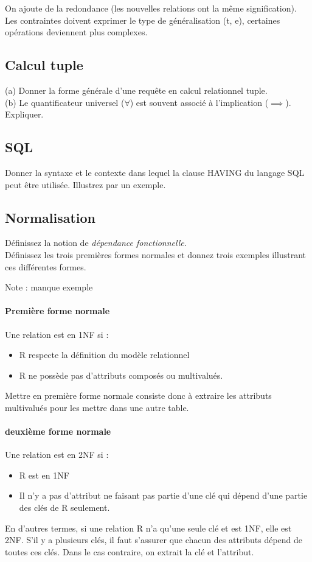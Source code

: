 On ajoute de la redondance (les nouvelles relations ont la m\^eme signification).
Les contraintes doivent exprimer le type de généralisation (t, e), 
certaines opérations deviennent plus complexes.

\subsection{Calcul tuple}

(a) Donner la forme générale d'une requête en calcul relationnel tuple.\\
(b) Le quantificateur universel ($\forall$) est souvent associé à l'implication 
($\implies$). Expliquer.

\subsection{SQL}
Donner la syntaxe et le contexte dans lequel la clause HAVING du langage SQL peut être 
utilisée. Illustrez par un exemple.



\subsection{Normalisation}
Définissez la notion de \textit{dépendance fonctionnelle}. \\
Définissez les trois premières formes normales et donnez trois exemples 
illustrant ces différentes formes.

Note : manque exemple

\paragraph{Première forme normale}
Une relation est en 1NF si : 
\begin{itemize}
	\item R respecte la définition du modèle relationnel
	\item R ne possède pas d'attributs composés ou multivalués.
\end{itemize}
Mettre en première forme normale consiste donc à extraire les attributs multivalués pour les mettre dans une autre table.

\paragraph{deuxième forme normale}
Une relation est en 2NF si : 
\begin{itemize}
	\item R est en 1NF
	\item Il n'y a pas d'attribut ne faisant pas partie d'une clé qui dépend 
	d'une partie des clés de R seulement.
\end{itemize}
En d'autres termes, si une relation R n'a qu'une seule clé et est 1NF, 
elle est 2NF. S'il y a plusieurs clés, il faut s'assurer que chacun des attributs 
dépend de toutes ces clés. Dans le cas contraire, on extrait la clé et l'attribut.


